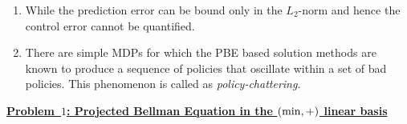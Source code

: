 \begin{enumerate}
\item While the prediction error can be bound only in the $L_2$-norm and hence the control error cannot be quantified.
\item There are simple MDPs for which the PBE based solution methods are known to produce a sequence of policies that oscillate within a set of bad policies. This phenomenon is called as \emph{policy-chattering}.\par
\end{enumerate}

\begin{comment}
Hence the Bellman operator cannot be combined as such with the least squares projection operator. Neverthless, this issue can be side stepped by considering the Bellman operator restricted to a given policy which can be shown to be a contraction map in a generalized $L_2$-norm. The Bellman operator restricted to a given policy can be combined with the linear least squares projection operator to find a fixed point. However, such a fixed point can approximate only the value function of the particular policy (with respect to which the Bellman operator has been restricted) and not the optimal value function. As a consequence, the PBE can only be used for approximate policy evaluation, i.e., it can be used to compute an approximation to the value function of a given policy. 
This means that the PBE based methods fall into the category of approximate policy iteration approach, i.e., the approximate policy evaluation should be followed by a policy improvement step. However, there is a `norm-mismatch' between the projection operator that minimizes the error in $L_2$-norm and the $\max/L_\infty$-norm required to guarantee policy improvement. As a result, the sub-optimal policy obtained from the approximate value function computed by the PBE is not guaranteed to be an improvement.\par
\end{comment}
\textbf{\underline{Problem~$1$: Projected Bellman Equation in the $(\min,+)$ linear basis}}\\
\begin{comment}
The major disadvantage of the PBE based methods is that they do not address the control problem completely. In fact, there are simple MDPs for which the PBE based solution methods are known to produce a sequence of policies that oscillate within a set of bad policies. This phenomenon is called as \emph{policy-chattering} and is a direct consequence of the norm mismatch.\par
\end{comment}
